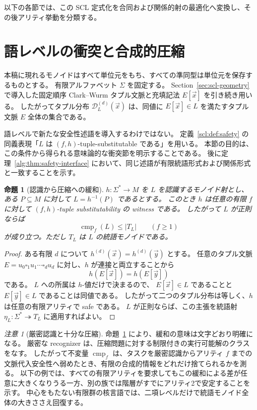\documentclass[10pt,a4paper]{ltjsarticle}
\newtheorem{proposition}[theorem]{命題}
\theoremstyle{definition}
\theoremstyle{remark}
\newtheorem{remark}[theorem]{注意}
\newcommand{\cmp}{\operatorname{cmp}}
\newcommand{\D}{\mathcal D}
\newcommand{\blank}{\square}
\begin{document}
以下の各節では、この SCL 定式化を合同および関係的射の最適化へ変換し、その後アリティ挙動を分類する。

\section{語レベルの衝突と合成的圧縮}

\label{sec:conflict}

本稿に現れるモノイドはすべて単位元をもち、すべての準同型は単位元を保存するものとする。
有限アルファベット $\Sigma$ を固定する。
Section~\ref{sec:scl-geometry} で導入した固定順序 Clark--Wurm タプル文脈と充填記法 $E[\vec x]$ を引き続き用いる。
したがってタプル分布 $\D_L^{(d)}(\vec x)$ は、同値に
$E[\vec x]\in L$
を満たすタプル文脈 $E$ 全体の集合である。

語レベルで新たな安全性述語を導入するわけではない。
定義~\ref{scl:def:safety} の同義表現「$L$ は $(f,h)$-tuple-substitutable である」を用いる。
本節の目的は、この条件から得られる意味論的な衝突節を明示することである。
後に定理~\ref{alg:thm:safety-interface} において、同じ述語が有限統語形式および関係形式と一致することを示す。

\begin{proposition}[認識から圧縮への緩和]
\label{conf:prop:recognition-relaxation}
$h:\Sigma^*\to M$ を $L$ を認識するモノイド射とし、ある $P\subseteq M$ に対して
$L=h^{-1}(P)$
であるとする。
このとき $h$ は任意の有限 $f$ に対して $(f,h)$-tuple substitutability の witness である。
したがって $L$ が正則ならば
\[
\cmp_f(L)\le |T_L|
\qquad(f\ge1)
\]
が成り立つ。ただし $T_L$ は $L$ の統語モノイドである。
\end{proposition}

\begin{proof}
ある有限 $d$ について
$h^{(d)}(\vec x)=h^{(d)}(\vec y)$
とする。
任意のタプル文脈
$E=u_0\blank_1u_1\cdots\blank_du_d$
に対し、$h$ が連接と両立することから
\[
h(E[\vec x])=h(E[\vec y])
\]
である。
$L$ への所属は $h$-値だけで決まるので、
$E[\vec x]\in L$
であることと
$E[\vec y]\in L$
であることは同値である。
したがって二つのタプル分布は等しく、$h$ は任意の有限アリティで safe である。
$L$ が正則ならば、この主張を統語射
$\eta_L:\Sigma^*\twoheadrightarrow T_L$
に適用すればよい。
\end{proof}

\begin{remark}[厳密認識と十分な圧縮]
命題~\ref{conf:prop:recognition-relaxation} により、緩和の意味は文字どおり明確になる。
厳密な recognizer は、圧縮問題に対する制限付きの実行可能解のクラスをなす。
したがって不変量 $\cmp_f$ は、タスクを厳密認識からアリティ $f$ までの文脈代入安全性へ弱めたとき、有限の合成的情報をどれだけ捨てられるかを測る。
以下の例では、すべての有限アリティを要求してもこの緩和による差が任意に大きくなりうる一方、別の族では階層がすでにアリティ2で安定することを示す。
中心をもたない有限群の核言語では、二項レベルだけで統語モノイド全体の大きささえ回復する。
\end{remark}
\end{document}
